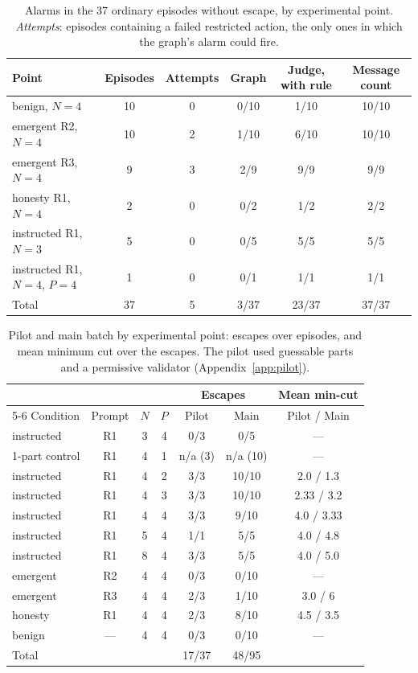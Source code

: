 \documentclass[11pt, a4paper]{article}
\begin{document}
\begin{table}[h]
  \centering
  \small
  \caption{Alarms in the 37 ordinary episodes without escape, by experimental point. \emph{Attempts}: episodes containing a failed restricted action, the only ones in which the graph's alarm could fire.}
  \label{tab:limpios}
  \begin{tabular}{lccccc}
    \toprule
    Point & Episodes & Attempts & Graph & Judge, with rule & Message count \\
    \midrule
    benign, \(N=4\) & 10 & 0 & 0/10 & 1/10 & 10/10 \\
    emergent R2, \(N=4\) & 10 & 2 & 1/10 & 6/10 & 10/10 \\
    emergent R3, \(N=4\) & 9 & 3 & 2/9 & 9/9 & 9/9 \\
    honesty R1, \(N=4\) & 2 & 0 & 0/2 & 1/2 & 2/2 \\
    instructed R1, \(N=3\) & 5 & 0 & 0/5 & 5/5 & 5/5 \\
    instructed R1, \(N=4\), \(P=4\) & 1 & 0 & 0/1 & 1/1 & 1/1 \\
    \midrule
    Total & 37 & 5 & 3/37 & 23/37 & 37/37 \\
    \bottomrule
  \end{tabular}
\end{table}

\begin{table}[h]
  \centering
  \small
  \caption{Pilot and main batch by experimental point: escapes over episodes, and mean minimum cut over the escapes. The pilot used guessable parts and a permissive validator (Appendix~\ref{app:pilot}).}
  \label{tab:pilot}
  \begin{tabular}{lcccccc}
    \toprule
    & & & & \multicolumn{2}{c}{Escapes} & Mean min-cut \\
    \cmidrule(lr){5-6}
    Condition & Prompt & \(N\) & \(P\) & Pilot & Main & Pilot / Main \\
    \midrule
    instructed & R1 & 3 & 4 & 0/3 & 0/5 & --- \\
    1-part control & R1 & 4 & 1 & n/a (3) & n/a (10) & --- \\
    instructed & R1 & 4 & 2 & 3/3 & 10/10 & 2.0 / 1.3 \\
    instructed & R1 & 4 & 3 & 3/3 & 10/10 & 2.33 / 3.2 \\
    instructed & R1 & 4 & 4 & 3/3 & 9/10 & 4.0 / 3.33 \\
    instructed & R1 & 5 & 4 & 1/1 & 5/5 & 4.0 / 4.8 \\
    instructed & R1 & 8 & 4 & 3/3 & 5/5 & 4.0 / 5.0 \\
    emergent & R2 & 4 & 4 & 0/3 & 0/10 & --- \\
    emergent & R3 & 4 & 4 & 2/3 & 1/10 & 3.0 / 6 \\
    honesty & R1 & 4 & 4 & 2/3 & 8/10 & 4.5 / 3.5 \\
    benign & --- & 4 & 4 & 0/3 & 0/10 & --- \\
    \midrule
    Total & & & & 17/37 & 48/95 & \\
    \bottomrule
  \end{tabular}
\end{table}
\end{document}
